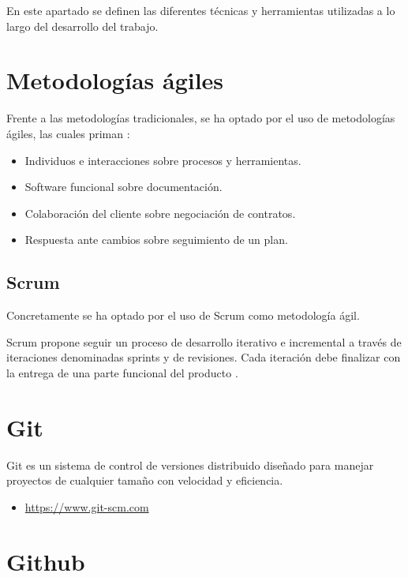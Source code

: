 
En este apartado se definen las diferentes técnicas y herramientas utilizadas a lo largo del desarrollo del trabajo.

\section{Metodologías ágiles}

Frente a las metodologías tradicionales, se ha optado por el uso de metodologías ágiles, las cuales priman \cite{agilealliance:agilemanifesto}:

\begin{itemize}
	\item Individuos e interacciones sobre procesos y herramientas.
	\item Software funcional sobre  documentación.
	\item Colaboración del cliente sobre negociación de contratos.
	\item Respuesta ante cambios sobre seguimiento de un plan.
\end{itemize}

\subsection{Scrum}

Concretamente se ha optado por el uso de Scrum como metodología ágil.

Scrum propone seguir un proceso de desarrollo iterativo e incremental a través de iteraciones denominadas sprints y de revisiones. Cada iteración debe finalizar con la entrega de una parte funcional del producto \cite{scrummanager}.

\section{Git}

Git es un sistema de control de versiones distribuido diseñado para manejar proyectos de cualquier tamaño con velocidad y eficiencia.

\begin{itemize}
	\item \url{https://www.git-scm.com}
\end{itemize}

\section{Github}


